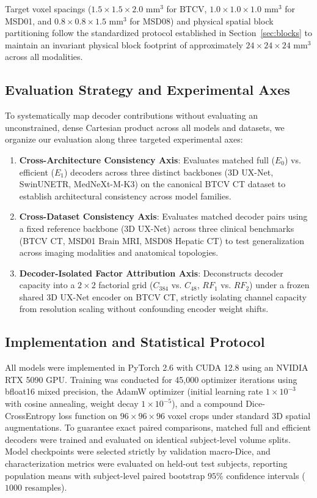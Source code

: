 Target voxel spacings ($1.5 \times 1.5 \times 2.0\text{~mm}^3$ for BTCV, $1.0 \times 1.0 \times 1.0\text{~mm}^3$ for MSD01, and $0.8 \times 0.8 \times 1.5\text{~mm}^3$ for MSD08) and physical spatial block partitioning follow the standardized protocol established in Section~\ref{sec:blocks} to maintain an invariant physical block footprint of approximately $24 \times 24 \times 24\text{~mm}^3$ across all modalities.

\subsection{Evaluation Strategy and Experimental Axes}
\label{sec:protocols}

To systematically map decoder contributions without evaluating an unconstrained, dense Cartesian product across all models and datasets, we organize our evaluation along three targeted experimental axes:
\begin{enumerate}
    \item \textbf{Cross-Architecture Consistency Axis}: Evaluates matched full ($E_0$) vs. efficient ($E_1$) decoders across three distinct backbones (3D UX-Net, SwinUNETR, MedNeXt-M-K3) on the canonical BTCV CT dataset to establish architectural consistency across model families.
    \item \textbf{Cross-Dataset Consistency Axis}: Evaluates matched decoder pairs using a fixed reference backbone (3D UX-Net) across three clinical benchmarks (BTCV CT, MSD01 Brain MRI, MSD08 Hepatic CT) to test generalization across imaging modalities and anatomical topologies.
    \item \textbf{Decoder-Isolated Factor Attribution Axis}: Deconstructs decoder capacity into a $2\times2$ factorial grid ($C_{384}$ vs. $C_{48}$, $RF_1$ vs. $RF_2$) under a frozen shared 3D UX-Net encoder on BTCV CT, strictly isolating channel capacity from resolution scaling without confounding encoder weight shifts.
\end{enumerate}

\subsection{Implementation and Statistical Protocol}
\label{sec:setup}

All models were implemented in PyTorch 2.6 with CUDA 12.8 using an NVIDIA RTX 5090 GPU. Training was conducted for 45,000 optimizer iterations using bfloat16 mixed precision, the AdamW optimizer (initial learning rate $1 \times 10^{-3}$ with cosine annealing, weight decay $1 \times 10^{-5}$), and a compound Dice-CrossEntropy loss function on $96 \times 96 \times 96$ voxel crops under standard 3D spatial augmentations. To guarantee exact paired comparisons, matched full and efficient decoders were trained and evaluated on identical subject-level volume splits. Model checkpoints were selected strictly by validation macro-Dice, and characterization metrics were evaluated on held-out test subjects, reporting population means with subject-level paired bootstrap $95\%$ confidence intervals ($1000$ resamples).
